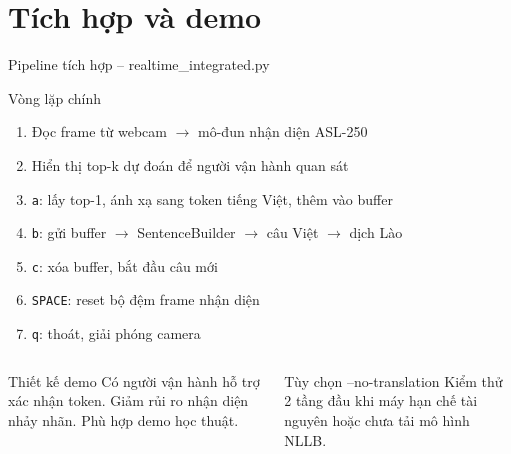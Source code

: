 ﻿\documentclass[aspectratio=169, 11pt]{beamer}
\begin{document}
\section{Tích hợp và demo}

\begin{frame}{Pipeline tích hợp -- realtime\_integrated.py}
    \begin{block}{Vòng lặp chính}
        \begin{enumerate}\small
            \item Đọc frame từ webcam $\rightarrow$ mô-đun nhận diện ASL-250
            \item Hiển thị top-k dự đoán để người vận hành quan sát
            \item \texttt{a}: lấy top-1, ánh xạ sang token tiếng Việt, thêm vào buffer
            \item \texttt{b}: gửi buffer $\rightarrow$ SentenceBuilder $\rightarrow$ câu Việt $\rightarrow$ dịch Lào
            \item \texttt{c}: xóa buffer, bắt đầu câu mới
            \item \texttt{SPACE}: reset bộ đệm frame nhận diện
            \item \texttt{q}: thoát, giải phóng camera
        \end{enumerate}
    \end{block}

    \vspace{0.2cm}
    \begin{columns}[T]
        \begin{exampleblock}{\small Thiết kế demo}
            \scriptsize Có người vận hành hỗ trợ xác nhận token. Giảm rủi ro nhận diện nhảy nhãn. Phù hợp demo học thuật.
        \end{exampleblock}

        \begin{alertblock}{\small Tùy chọn --no-translation}
            \scriptsize Kiểm thử 2 tầng đầu khi máy hạn chế tài nguyên hoặc chưa tải mô hình NLLB.
        \end{alertblock}
    \end{columns}
\end{frame}
\end{document}

